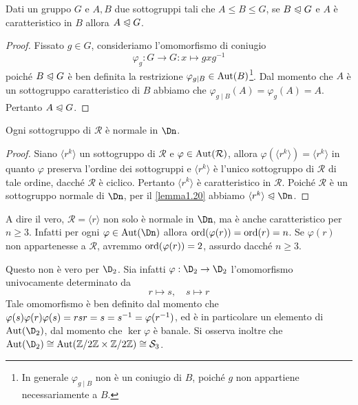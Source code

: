 \documentclass[11pt]{scrartcl}
\begin{document}
	\begin{lemma}
		\label{lemma1.20}
		Dati un gruppo $G$ e $A, B$ due sottogruppi tali che $A \leqslant B \leqslant G$,
		se $B\trianglelefteqslant G$ e $A$ è caratteristico in $B$ allora 
		$A \trianglelefteqslant G$.
	\end{lemma}
	
	\begin{proof}
		Fissato $g \in G$, consideriamo l'omomorfismo di coniugio 
		\[
		\varphi_g : G\longrightarrow G : x\longmapsto gxg^{-1}
		\] poiché 
		$B\trianglelefteqslant G$ è ben definita la restrizione $\varphi_{g\mid B} \in \operatorname{Aut}(B)$\footnote{
			In generale $\varphi_{g\mid B}$ non è un 
			coniugio di $B$, poiché $g$ non appartiene necessariamente a $B$.
		}. 
		Dal momento che $A$ è
		un sottogruppo caratteristico di $B$ abbiamo che $\varphi_{g\mid B}(A) =
		\varphi_g(A) = A$.
		Pertanto $A \trianglelefteqslant G$.
	\end{proof}
	
	
	\begin{corollary}
		Ogni sottogruppo di $\mathcal{R}$ è normale in $\Dn$.
	\end{corollary}
	
	\begin{proof}
		Siano $\langle r^k\rangle$ un sottogruppo di $\mathcal{R}$ e $\varphi
		\in \operatorname{Aut}(\mathcal{R})$, allora $\varphi(\langle r^k\rangle) = \langle r^k\rangle$
		in quanto $\varphi$ preserva l'ordine dei sottogruppi e $\langle r^k\rangle$
		è l'unico sottogruppo di $\mathcal{R}$ di tale ordine, dacché $\mathcal{R}$ è ciclico.
		Pertanto $\langle r^k\rangle$
		è caratteristico in $\mathcal{R}$. Poiché $\mathcal{R}$ è un sottogruppo
		normale di $\Dn$, per il \autoref{lemma1.20}
		abbiamo $\langle r^k\rangle\trianglelefteqslant \Dn$.
	\end{proof}
	
	\begin{remark}
		A dire il vero, $\mathcal{R} = \langle r \rangle$ non solo è normale in $\Dn$,
		ma è anche caratteristico per $n \geq 3$.
		Infatti per ogni $\varphi \in \Aut(\Dn)$ allora
		$\operatorname{ord}(\varphi(r)) = \operatorname{ord}(r) = n$.
		Se $\varphi(r)$ non appartenesse a $\mathcal{R}$, avremmo $\operatorname{ord}(\varphi(r)) = 2$,
		assurdo dacché $n \geq 3$. \medskip

		Questo non è vero per $\D_2$. Sia infatti $\varphi : \D_2 \to \D_2$ l'omomorfismo
		univocamente determinato da
		\[ r \mapsto s, \quad s \mapsto r \]
		Tale omomorfismo è ben definito dal momento che $\varphi(s) \varphi(r) \varphi(s) =
		r s r = s = s^{-1} = \varphi(r^{-1})$, ed è in particolare un elemento di $\Aut(\D_2)$,
		dal momento che $\ker \varphi$ è banale. Si osserva inoltre che $\Aut(\D_2) \cong \Aut(\Z2 \times \Z2) \cong \mathcal{S}_3$.
	\end{remark}
	
\end{document}
